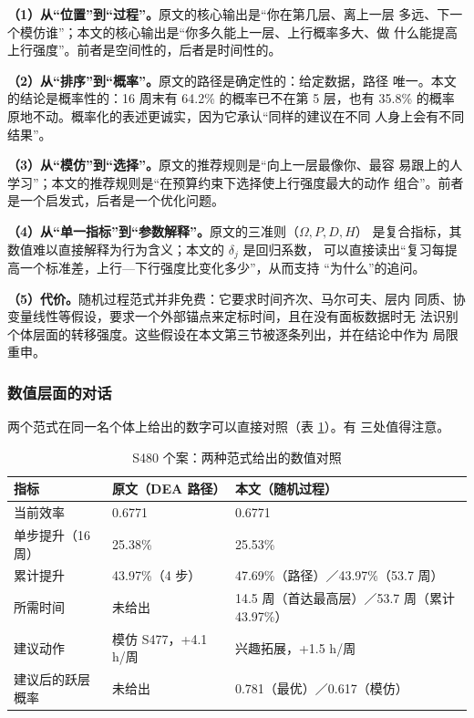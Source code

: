 \textbf{（1）从“位置”到“过程”。}原文的核心输出是“你在第几层、离上一层
多远、下一个模仿谁”；本文的核心输出是“你多久能上一层、上行概率多大、做
什么能提高上行强度”。前者是空间性的，后者是时间性的。

\textbf{（2）从“排序”到“概率”。}原文的路径是确定性的：给定数据，路径
唯一。本文的结论是概率性的：16 周末有 64.2\% 的概率已不在第 5 层，也有
35.8\% 的概率原地不动。概率化的表述更诚实，因为它承认“同样的建议在不同
人身上会有不同结果”。

\textbf{（3）从“模仿”到“选择”。}原文的推荐规则是“向上一层最像你、最容
易跟上的人学习”；本文的推荐规则是“在预算约束下选择使上行强度最大的动作
组合”。前者是一个启发式，后者是一个优化问题。

\textbf{（4）从“单一指标”到“参数解释”。}原文的三准则（$\Omega,P,D,H$）
是复合指标，其数值难以直接解释为行为含义；本文的 $\delta_j$ 是回归系数，
可以直接读出“复习每提高一个标准差，上行—下行强度比变化多少”，从而支持
“为什么”的追问。

\textbf{（5）代价。}随机过程范式并非免费：它要求时间齐次、马尔可夫、层内
同质、协变量线性等假设，要求一个外部锚点来定标时间，且在没有面板数据时无
法识别个体层面的转移强度。这些假设在本文第三节被逐条列出，并在结论中作为
局限重申。

\subsubsection{数值层面的对话}

两个范式在同一名个体上给出的数字可以直接对照（表 \ref{tab:numbers}）。有
三处值得注意。

\begin{table}[htbp]
\centering
\tabfont
\caption{S480 个案：两种范式给出的数值对照}
\label{tab:numbers}
\begin{tabularx}{\textwidth}{@{}p{3.2cm}p{4.6cm}X@{}}
\toprule
指标 & 原文（DEA 路径） & 本文（随机过程） \\
\midrule
当前效率 & 0.6771 & 0.6771 \\
单步提升（16 周） & 25.38\% & 25.53\% \\
累计提升 & 43.97\%（4 步） & 47.69\%（路径）／43.97\%（53.7 周） \\
所需时间 & 未给出 & 14.5 周（首达最高层）／53.7 周（累计 43.97\%） \\
建议动作 & 模仿 S477，+4.1 h/周 & 兴趣拓展，+1.5 h/周 \\
建议后的跃层概率 & 未给出 & 0.781（最优）／0.617（模仿） \\
\bottomrule
\end{tabularx}
\end{table}

